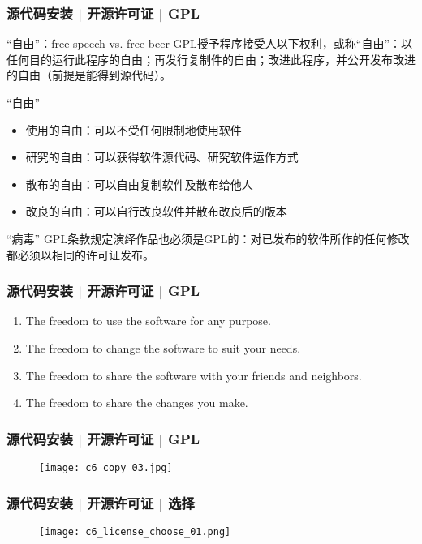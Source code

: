 \begin{frame}
  \frametitle{源代码安装 | 开源许可证 | GPL}
  \begin{block}{“自由”：free speech vs. free beer}
    GPL授予程序接受人以下权利，或称“自由”：以任何目的运行此程序的自由；再发行复制件的自由；改进此程序，并公开发布改进的自由（前提是能得到源代码）。
  \end{block}
  \pause
  \begin{block}{\alert{“自由”}}
    \begin{itemize}
      \item 使用的自由：可以不受任何限制地使用软件
      \item 研究的自由：可以获得软件源代码、研究软件运作方式
      \item 散布的自由：可以自由复制软件及散布给他人
      \item 改良的自由：可以自行改良软件并散布改良后的版本
    \end{itemize}
  \end{block}
  \pause
  \begin{block}{“病毒”}
    GPL条款规定演绎作品也必须是GPL的：对已发布的软件所作的任何修改都必须以相同的许可证发布。
  \end{block}
\end{frame}

\begin{frame}
  \frametitle{源代码安装 | 开源许可证 | GPL}
  \begin{enumerate}
    \item The freedom to use the software for any purpose.
    \item The freedom to change the software to suit your needs.
    \item The freedom to share the software with your friends and neighbors.
    \item The freedom to share the changes you make.
  \end{enumerate}
\end{frame}

\begin{frame}
  \frametitle{源代码安装 | 开源许可证 | GPL}
  \begin{figure}
    \centering
    \texttt{[image: c6\_copy\_03.jpg]}
  \end{figure}
\end{frame}

\begin{frame}
  \frametitle{源代码安装 | 开源许可证 | 选择}
  \begin{figure}
    \centering
    \texttt{[image: c6\_license\_choose\_01.png]}
  \end{figure}
\end{frame}

